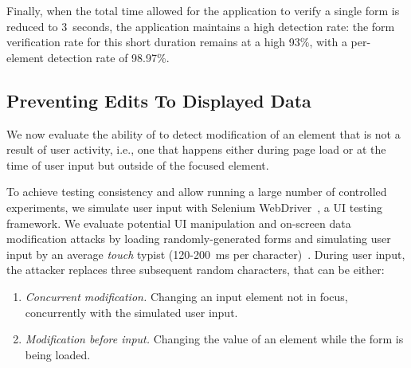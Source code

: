 Finally, when the total time allowed for the application to verify a single form is reduced to 3~seconds, the application maintains a high detection rate: the form verification rate for this short duration remains at a high 93\%, with a per-element detection rate of 98.97\%.




\subsection{Preventing Edits To Displayed Data} \label{ssec:inputSupervisionEvaluation}

We now evaluate the ability of \sysname to detect modification of an element that is not a result of user activity, i.e., one that happens either during page load or at the time of user input but outside of the focused element.

To achieve testing consistency and allow running a large number of controlled experiments, we simulate user input with Selenium WebDriver~\cite{seleniumWebDriver}, a UI testing framework.
We evaluate potential UI manipulation and on-screen data modification attacks by loading randomly-generated forms and simulating user input by an average \textit{touch} typist (120-200~ms per character)~\cite{pereira2013effect}.
During user input, the attacker replaces three subsequent random characters, that can be either:
\begin{enumerate}
	\item \emph{Concurrent modification.} Changing an input element not in focus, concurrently with the simulated user input.
    \item \emph{Modification before input.} Changing the value of an element while the form is being loaded.
\end{enumerate}